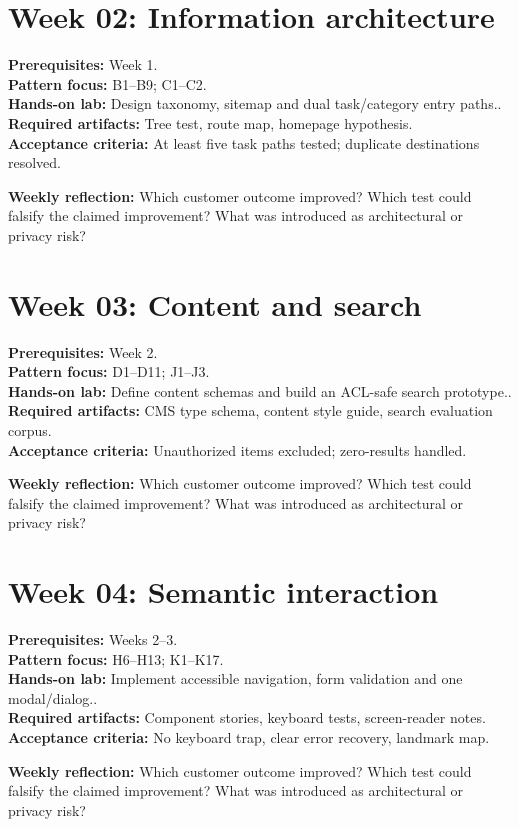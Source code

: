 \documentclass[11pt]{article}
\begin{document}
\section{Week 02: Information architecture}
\textbf{Prerequisites:} Week 1.\\
\textbf{Pattern focus:} B1--B9; C1--C2.\\
\textbf{Hands-on lab:} Design taxonomy, sitemap and dual task/category entry paths..\\
\textbf{Required artifacts:} Tree test, route map, homepage hypothesis.\\
\textbf{Acceptance criteria:} At least five task paths tested; duplicate destinations resolved.
\begin{decisionbox}\textbf{Weekly reflection:} Which customer outcome improved? Which test could falsify the claimed improvement? What was introduced as architectural or privacy risk?\end{decisionbox}
\section{Week 03: Content and search}
\textbf{Prerequisites:} Week 2.\\
\textbf{Pattern focus:} D1--D11; J1--J3.\\
\textbf{Hands-on lab:} Define content schemas and build an ACL-safe search prototype..\\
\textbf{Required artifacts:} CMS type schema, content style guide, search evaluation corpus.\\
\textbf{Acceptance criteria:} Unauthorized items excluded; zero-results handled.
\begin{decisionbox}\textbf{Weekly reflection:} Which customer outcome improved? Which test could falsify the claimed improvement? What was introduced as architectural or privacy risk?\end{decisionbox}
\section{Week 04: Semantic interaction}
\textbf{Prerequisites:} Weeks 2--3.\\
\textbf{Pattern focus:} H6--H13; K1--K17.\\
\textbf{Hands-on lab:} Implement accessible navigation, form validation and one modal/dialog..\\
\textbf{Required artifacts:} Component stories, keyboard tests, screen-reader notes.\\
\textbf{Acceptance criteria:} No keyboard trap, clear error recovery, landmark map.
\begin{decisionbox}\textbf{Weekly reflection:} Which customer outcome improved? Which test could falsify the claimed improvement? What was introduced as architectural or privacy risk?\end{decisionbox}
\end{document}
